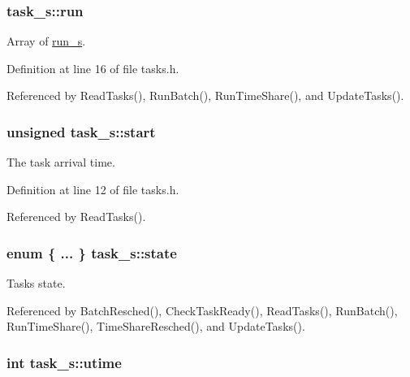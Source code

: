 \hypertarget{structtask__s_a1436b6ae08fcebe2915050bc5874b938}{
\subsubsection[{run}]{ task\-\_\-s\-::run}}\label{structtask__s_a1436b6ae08fcebe2915050bc5874b938}


Array of \hyperlink{structrun__s}{run\-\_\-s}. 



Definition at line 16 of file tasks.\-h.



Referenced by Read\-Tasks(), Run\-Batch(), Run\-Time\-Share(), and Update\-Tasks().

\hypertarget{structtask__s_ad69dba2449ece3f10eea4ed27af2e957}{
\subsubsection[{start}]{\setlength{\rightskip}{0pt plus 5cm}unsigned task\-\_\-s\-::start}}\label{structtask__s_ad69dba2449ece3f10eea4ed27af2e957}


The task arrival time. 



Definition at line 12 of file tasks.\-h.



Referenced by Read\-Tasks().

\hypertarget{structtask__s_ae7a9cf3d567939ba2c9866cdfba022d8}{
\subsubsection[{state}]{\setlength{\rightskip}{0pt plus 5cm}enum \{ ... \}   task\-\_\-s\-::state}}\label{structtask__s_ae7a9cf3d567939ba2c9866cdfba022d8}


Tasks state. 



Referenced by Batch\-Resched(), Check\-Task\-Ready(), Read\-Tasks(), Run\-Batch(), Run\-Time\-Share(), Time\-Share\-Resched(), and Update\-Tasks().

\hypertarget{structtask__s_af436f2616e78fd2466cc8b1c59875653}{
\subsubsection[{utime}]{\setlength{\rightskip}{0pt plus 5cm}int task\-\_\-s\-::utime}}\label{structtask__s_af436f2616e78fd2466cc8b1c59875653}


